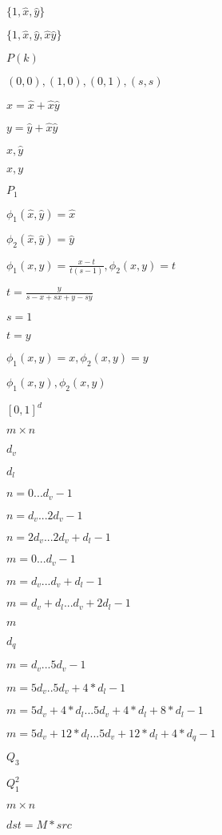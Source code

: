 \documentclass{article}
\begin{document}
$\{1,\hat x,\hat y\}$
\pagebreak

$\{1,\hat x,\hat y,\hat x\hat y\}$
\pagebreak

$P(k)$
\pagebreak

$(0,0),(1,0),(0,1),(s,s)$
\pagebreak

$x=\hat x+\hat x\hat y$
\pagebreak

$y=\hat y+\hat x\hat y$
\pagebreak

$\hat x,\hat y$
\pagebreak

$x,y$
\pagebreak

$P_1$
\pagebreak

$\phi_1(\hat x,\hat y)=\hat x$
\pagebreak

$\phi_2(\hat x,\hat y)=\hat y$
\pagebreak

$\phi_1(x,y)=\frac{x-t}{t(s-1)},\phi_2(x,y)=t$
\pagebreak

$t=\frac{y}{s-x+sx+y-sy}$
\pagebreak

$s=1$
\pagebreak

$t=y$
\pagebreak

$\phi_1(x,y)=x,\phi_2(x,y)=y$
\pagebreak

$\phi_1(x,y),\phi_2(x,y)$
\pagebreak

$[0,1]^d$
\pagebreak

$m\times n$
\pagebreak

$d_v$
\pagebreak

$d_l$
\pagebreak

$n=0...d_v-1$
\pagebreak

$n=d_v...2d_v-1$
\pagebreak

$n=2d_v...2d_v+d_l-1$
\pagebreak

$m=0...d_v-1$
\pagebreak

$m=d_v...d_v+d_l-1$
\pagebreak

$m=d_v+d_l...d_v+2d_l-1$
\pagebreak

$m$
\pagebreak

$d_q$
\pagebreak

$m=d_v...5d_v-1$
\pagebreak

$m=5d_v..5d_v+4*d_l-1$
\pagebreak

$m=5d_v+4*d_l...5d_v+4*d_l+8*d_l-1$
\pagebreak

$m=5d_v+12*d_l...5d_v+12*d_l+4*d_q-1$
\pagebreak

$Q_3$
\pagebreak

$Q_1^2$
\pagebreak

$m \times n$
\pagebreak

$dst = M*src$
\pagebreak
\end{document}
